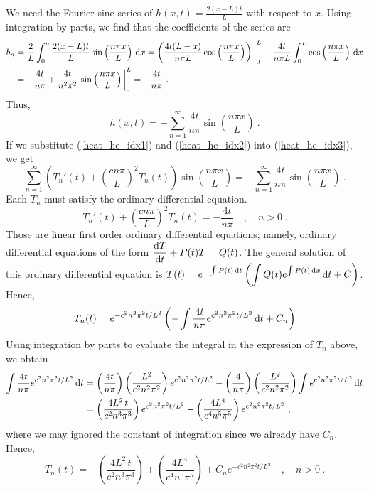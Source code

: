 \begin{egg}
We need the Fourier sine series of
$\displaystyle h(x,t) = \frac{2(x-L)t}{L}$
with respect to $x$.  Using integration by parts, we find that the
coefficients of the series are
\begin{align*}
b_n &= \frac{2}{L}\int_0^n \frac{2(x-L)t}{L}
\sin\left(\frac{n\pi x}{L}\right) \,\mathrm{d}{x}
= \left( \frac{4t(L-x)}{n\pi L} 
\cos\left(\frac{n\pi x}{L}\right)\right)\bigg|_0^L 
+ \frac{4t}{n\pi L} \int_0^L \cos\left(\frac{n\pi x}{L}\right) \,\mathrm{d}{x} \\
&= -\frac{4t}{n\pi} + \frac{4t}{n^2\pi^2} \,
\sin\left(\frac{n\pi x}{L}\right)\bigg|_0^L
= -\frac{4t}{n\pi}  \ .
\end{align*}
Thus,
\begin{equation} \label{heat_he_idx2}
h(x,t) = -\sum_{n=1}^\infty \frac{4t}{n\pi} \sin\left(\frac{n\pi x}{L}\right) \ .
\end{equation}
If we substitute (\ref{heat_he_idx1}) and (\ref{heat_he_idx2}) into
(\ref{heat_he_idx3}), we get
\[
\sum_{n=1}^\infty \left( T_n'(t) + \left(\frac{c n\pi}{L}\right)^2
T_n(t) \right) \sin\left(\frac{n\pi x}{L}\right) =
-\sum_{n=1}^\infty \frac{4t}{n\pi} \sin\left(\frac{n\pi x}{L}\right) \ .
\]
Each $T_n$ must satisfy the ordinary differential equation.
\[
T_n'(t) + \left(\frac{c n\pi}{L}\right)^2 T_n(t) = - \frac{4t}{n\pi}
\quad , \quad n>0 \ .
\]
Those are linear first order ordinary differential equations; namely,
ordinary differential equations of the form 
$\displaystyle \frac{\mathrm{d}T}{\mathrm{d}{t}} + P(t)T = Q(t)$.
The general solution of this ordinary differential equation is
$\displaystyle T(t) = e^{-\int P(t)\,\mathrm{d}{t}}
\left(\int Q(t) e^{\int P(t)\,\mathrm{d}{x}} \,\mathrm{d}{t} + C \right)$.
Hence,
\[
T_n(t) = e^{-c^2n^2\pi^2 t/L^2} \left( - \int \frac{4t}{n\pi}
e^{c^2n^2\pi^2 t/L^2} \,\mathrm{d}{t} + C_n \right)
\]
Using integration by parts to evaluate the integral in the
expression of $T_n$ above, we obtain
\begin{align*}
\int \frac{4t}{n\pi} e^{c^2n^2\pi^2 t/L^2} \,\mathrm{d}{t} &=
\left(\frac{4t}{n\pi}\right)\left(\frac{L^2}{c^2n^2\pi^2}\right)
e^{c^2n^2\pi^2 t/L^2}
- \left(\frac{4}{n\pi}\right)\left(\frac{L^2}{c^2n^2\pi^2}\right)
\int e^{c^2n^2\pi^2 t/L^2} \,\mathrm{d}{t} \\
&= \left(\frac{4L^2\,t}{c^2n^3\pi^3}\right) e^{c^2n^2\pi^2 t/L^2}
- \left(\frac{4L^4}{c^4n^5\pi^5}\right) e^{c^2n^2\pi^2 t/L^2} \ ,
\end{align*}
where we may ignored the constant of integration since we already have
$C_n$.  Hence,
\[
T_n(t) = -\left(\frac{4L^2\,t}{c^2n^3\pi^3}\right)
+ \left(\frac{4L^4}{c^4n^5\pi^5}\right) + C_n e^{-c^2n^2\pi^2 t/L^2}
\quad , \quad n > 0 \ .
\]


\end{egg}

